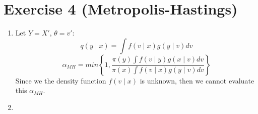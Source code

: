 \documentclass[12pt,letterpaper]{article}
\begin{document}
\newpage
\section*{Exercise 4 (Metropolis-Hastings)}
\begin{enumerate}[leftmargin=!,labelindent=5pt]
\item Let $Y = X'$, $\theta = v'$:
$$q(y \mid x) = \int f(v \mid x) g(y \mid v) dv$$
$$
\alpha_{MH} = min \left \{ 1,
\frac{\pi(y)\int f(v \mid y) g(x \mid v) dv}
{\pi(x)\int f(v \mid x) g(y \mid v) dv}
\right \}
$$
Since we the density function $f(v \mid x)$ is unknown, then we cannot 
evaluate this $\alpha_{MH}$.

\item


\end{enumerate}
\end{document}
